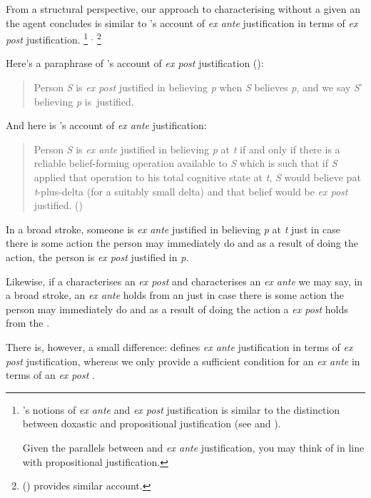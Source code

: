\begin{note}
  From a structural perspective, our approach to characterising  without a given an  the agent concludes is similar to \citeauthor{Goldman:1979ui}'s account of \emph{ex ante} justification in terms of \emph{ex post} justification.%
  \footnote{
    \citeauthor{Goldman:1979ui}'s notions of \emph{ex ante} and \emph{ex post} justification is similar to the distinction between doxastic and propositional justification (see \cite{Firth:1978vi} and \cite[esp.\ fn.1]{Silva:2020aa}).

    Given the parallels between  and \emph{ex ante} justification, you may think of  in line with propositional justification.
  }%
  \(^{,}\)%
  \footnote{
    \citeauthor{Turri:2010aa} (\citeyear{Turri:2010aa}) provides similar account.
  }

  Here's a paraphrase of \citeauthor{Goldman:1979ui}'s account of \emph{ex post} justification (\citeyear[cf.][21]{Goldman:1979ui}):
  \begin{quote}
    Person \emph{S} is \emph{ex post} justified in believing \emph{p} when \emph{S} believes \emph{p}, and we say \emph{S}' believing \emph{p} is~justified.
  \end{quote}
  And here is \citeauthor{Goldman:1979ui}'s account of \emph{ex ante} justification:
  \begin{quote}
    Person \emph{S} is \emph{ex ante} justified in believing \emph{p} at \emph{t} if and only if there is a reliable belief-forming operation available to \emph{S} which is such that if \emph{S} applied that operation to his total cognitive state at \emph{t}, \emph{S} would believe pat \emph{t}-plus-delta (for a suitably small delta) and that belief would be \emph{ex post} justified.%
    \mbox{}\hfill\mbox{(\citeyear[21]{Goldman:1979ui})}
  \end{quote}
  In a broad stroke, someone is \emph{ex ante} justified in believing \emph{p} at \emph{t} just in case there is some action the person may immediately do and as a result of doing the action, the person is \emph{ex post} justified in \emph{p}.

  Likewise, if a \supportI{} characterises an \emph{ex post}  and \supportII{} characterises an \emph{ex ante}  we may say, in a broad stroke, an \emph{ex ante} \fingfr{} holds from an \agpe{} just in case there is some action the person may immediately do and as a result of doing the action a \emph{ex post} \fingfr{} holds from the \agpe{}.

  There is, however, a small difference:
  \citeauthor{Goldman:1979ui} defines \emph{ex ante} justification in terms of \emph{ex post} justification, whereas we only provide a sufficient condition for an \emph{ex ante} \fingfr{} in terms of an \emph{ex post} \fingfr{}.
\end{note}



